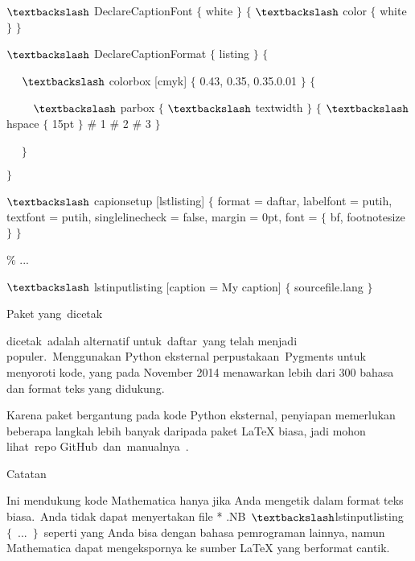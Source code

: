 $\textbackslash$ DeclareCaptionFont $ \{ $ white $ \} $ $ \{ $ $\textbackslash$ color $ \{ $ white $ \} $ $ \} $\par

 $\textbackslash$ DeclareCaptionFormat $ \{ $ listing $ \} $ $ \{ $\par

~~ $\textbackslash$ colorbox [cmyk] $ \{ $ 0.43, 0.35, 0.35.0.01 $ \} $ $ \{ $\par

~~~~ $\textbackslash$ parbox $ \{ $ $\textbackslash$ textwidth $ \} $ $ \{ $ $\textbackslash$ hspace $ \{ $ 15pt $ \} $ $\#$ 1 $\#$ 2 $\#$ 3 $ \} $\par

~~ $ \} $\par

 $ \} $\par

 $\textbackslash$ capionsetup [lstlisting] $ \{ $ format = daftar, labelfont = putih, textfont = putih, singlelinecheck = false, margin = 0pt, font = $ \{ $ bf, footnotesize $ \} $ $ \} $\par

 $\%$ ...\par

 $\textbackslash$ lstinputlisting [caption = My caption] $ \{ $ sourcefile.lang $ \} $\par

Paket yang dicetak \par

dicetak adalah alternatif untuk daftar yang telah menjadi populer. Menggunakan Python eksternal perpustakaan Pygments untuk menyoroti kode, yang pada November 2014 menawarkan lebih dari 300 bahasa dan format teks yang didukung.\par

Karena paket bergantung pada kode Python eksternal, penyiapan memerlukan beberapa langkah lebih banyak daripada paket LaTeX biasa, jadi mohon lihat repo GitHub dan manualnya .\par

Catatan\par

Ini mendukung kode Mathematica hanya jika Anda mengetik dalam format teks biasa. Anda tidak dapat menyertakan file * .NB $\textbackslash$lstinputlisting $ \{ $ ... $ \} $ seperti yang Anda bisa dengan bahasa pemrograman lainnya, namun Mathematica dapat mengekspornya ke sumber LaTeX yang berformat cantik.\par

